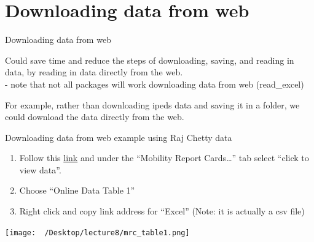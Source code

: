 \documentclass[8pt,ignorenonframetext,dvipsnames]{beamer}
\providecommand{\tightlist}{%
  \setlength{\itemsep}{0pt}\setlength{\parskip}{0pt}}
\begin{document}
\section{Downloading data from web}\label{downloading-data-from-web}

\begin{frame}{Downloading data from web}

Could save time and reduce the steps of downloading, saving, and reading
in data, by reading in data directly from the web.\\
- note that not all packages will work downloading data from web
(read\_excel)

For example, rather than downloading ipeds data and saving it in a
folder, we could download the data directly from the web.

\end{frame}

\begin{frame}{Downloading data from web example using Raj Chetty data}

\begin{enumerate}
\def\labelenumi{\arabic{enumi}.}
\tightlist
\item
  Follow this \href{http://www.equality-of-opportunity.org/data/}{link}
  and under the ``Mobility Report Cards\ldots{}'' tab select ``click to
  view data''.\\
\item
  Choose ``Online Data Table 1''
\item
  Right click and copy link address for ``Excel'' (Note: it is actually
  a csv file)
\end{enumerate}

\texttt{[image: ~/Desktop/lecture8/mrc\_table1.png]}~

\end{frame}
\end{document}
